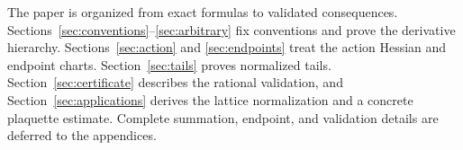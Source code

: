The paper is organized from exact formulas to validated consequences.
Sections~\ref{sec:conventions}--\ref{sec:arbitrary} fix conventions and prove
the derivative hierarchy.  Sections~\ref{sec:action} and
\ref{sec:endpoints} treat the action Hessian and endpoint charts.
Section~\ref{sec:tails} proves normalized tails.  Section~\ref{sec:certificate}
describes the rational validation, and Section~\ref{sec:applications}
derives the lattice normalization and a concrete plaquette estimate.
Complete summation, endpoint, and validation details are deferred to the
appendices.
